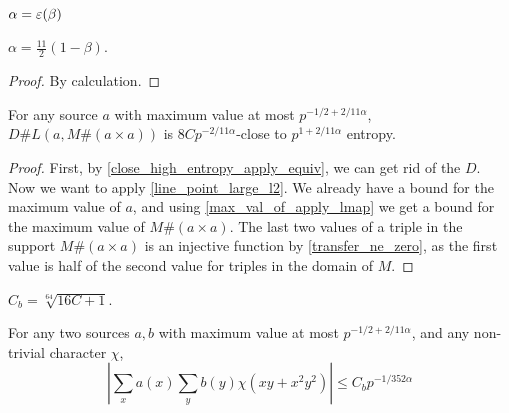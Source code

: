 \begin{definition}
    \label{bourgainα}
    \leanok
    $\alpha = \operatorname{\varepsilon}(\beta)$
\end{definition}

\begin{lemma}
    \label{bα_val}
    \leanok
    $\alpha = \frac{11}2(1 - \beta)$.
\end{lemma}

\begin{proof}
    \leanok
    By calculation.
\end{proof}

\begin{lemma}
    \label{bourgain_extractor_aux₃}
    \leanok
    For any source $a$ with maximum value at most $p^{-1/2 + 2/11 \alpha}$,
    $D \# L(a, M \# (a \times a))$ is $8 C p^{-2/11 \alpha}$-close to $p^{1+2/11 \alpha}$ entropy.
\end{lemma}

\begin{proof}
    \leanok
    First, by \ref{close_high_entropy_apply_equiv}, we can get rid of the $D$.
    Now we want to apply \ref{line_point_large_l2}.
    We already have a bound for the maximum value of $a$, and using \ref{max_val_of_apply_lmap} we get a bound
    for the maximum value of $M \# (a \times a)$.
    The last two values of a triple in the support $M \# (a \times a)$ is an injective function
    by \ref{transfer_ne_zero}, as the first value is half of the second value for triples in the domain of $M$.
\end{proof}

\begin{definition}
    \label{bourgain_C}
    \leanok
    $C_b = \sqrt[64]{16C + 1}$.
\end{definition}

\begin{theorem}
    \label{bourgain_extractor}
    \leanok
    For any two sources $a, b$ with maximum value at most $p^{-1/2 + 2/11 \alpha}$,
    and any non-trivial character $\chi$,
    $$ |\sum_x a(x) \sum_y b(y) \chi(xy + x^2y^2)| \leq C_b p^{-1/352 \alpha}$$
\end{theorem}

